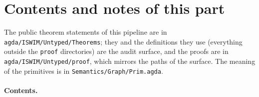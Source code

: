 \documentclass[10pt]{article}
\theoremstyle{acmplain}
\begin{document}
\section*{Contents and notes of this part}

The public theorem statements of this pipeline are in
\texttt{agda/ISWIM/Untyped/Theorems}; they and the definitions they use
(everything outside the \texttt{proof} directories) are the audit surface,
and the proofs are in \texttt{agda/ISWIM/Untyped/proof}, which mirrors the paths
of the surface. The meaning of the primitives is in
\texttt{Semantics/Graph/Prim.agda}.

\paragraph{Contents.}
\end{document}
